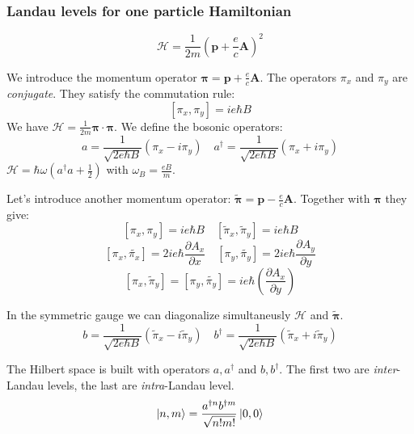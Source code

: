 \documentclass{beamer}
\begin{document}
\begin{frame}
\frametitle{Landau levels for one particle Hamiltonian}
\begin{center}
\vspace{-30pt}
\[ \mathcal{H} = \frac{1}{2 m} \left( \mathbf{p} + \frac{e}{c}\mathbf{A} \right)^2 \]

We introduce the momentum operator $\mathbf{\pi} = \mathbf{p} + \frac{e}{c} \mathbf{A}$. The operators $\pi_x$ and $\pi_y$ are \textit{conjugate}. They satisfy the commutation rule:
\[
[ \pi_x, \pi_y ] = i e \hbar B
\]
We have $ \mathcal{H} = \frac{1}{2 m} \mathbf{\pi} \cdot \mathbf{\pi} $. We define the bosonic operators:
\[
a = \frac{1}{\sqrt{2 e \hbar B}} \left( \pi_x - i \pi_y \right) \quad
a^{\dagger} = \frac{1}{\sqrt{2 e \hbar B}} \left( \pi_x + i \pi_y \right)
\]
$ \mathcal{H} = \hbar \omega \left( a^{\dagger} a + \frac{1}{2} \right) $ with $\omega_B = \frac{e B}{m}$.
\end{center}
\end{frame}

\begin{frame}
\begin{center}

Let's introduce another momentum operator: $\tilde{\mathbf{\pi}} = \mathbf{p} - \frac{e}{c} \mathbf{A}$. Together with $\mathbf{\pi}$ they give:
\[ [\pi_x, \pi_y ] = i e \hbar B \quad [\tilde{\pi}_x, \tilde{\pi}_y ] = i e \hbar B  \]
\[ [\pi_x, \tilde{\pi_x} ] = 2 i e \hbar \frac{\partial A_x}{\partial x} \quad [\pi_y, \tilde{\pi_y} ] = 2 i e \hbar \frac{\partial A_y}{\partial y} \]
\[
[\pi_x, \tilde{\pi}_y] = [\pi_y, \tilde{\pi_y}] = i e \hbar \left( \frac{\partial A_x}{\partial y} \right)
\]

In the symmetric gauge we can diagonalize simultaneusly $\mathcal{H}$ and $\mathbf{\tilde{\pi}}$.
\[
b = \frac{1}{\sqrt{2 e \hbar B}} \left( \tilde{\pi}_x - i \tilde{\pi}_y \right) \quad
b^{\dagger} = \frac{1}{\sqrt{2 e \hbar B}} \left( \tilde{\pi}_x + i \tilde{\pi}_y \right)
\]


The Hilbert space is built with operators $a, a^{\dagger}$ and $b, b^{\dagger}$. The first two are \textit{inter}-Landau levels, the last are \textit{intra}-Landau level. 
\[
\ket{n, m} = \frac{a^{\dagger n} b^{\dagger m}}{\sqrt{n! m!}} \ket{0, 0}
\]


\end{center}
\end{frame}
\end{document}
